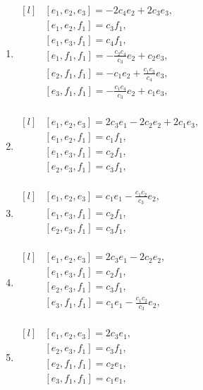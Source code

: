\begin{adjustwidth*}{-0.5cm}{0cm}
\begin{multicols*}{2}
\begin{enumerate}
    \item $\begin{matrix*}[l]
            & [e_1, e_2, e_3] =  - 2 c_{4} e_2 + 2 c_{3} e_3, \\
            & [e_1, e_2, f_1] = c_{3} f_1, \\
            & [e_1, e_3, f_1] = c_{4} f_1, \\
            & [e_1, f_1, f_1] =  - \frac{c_{2} c_{4}}{c_{3}} e_2 + c_{2} e_3, \\
            & [e_2, f_1, f_1] =  - c_{1} e_2 + \frac{c_{1} c_{3}}{c_{4}} e_3, \\
            & [e_3, f_1, f_1] =  - \frac{c_{1} c_{4}}{c_{3}} e_2 + c_{1} e_3, \\
        \end{matrix*}$

    \item $\begin{matrix*}[l]
            & [e_1, e_2, e_3] = 2 c_{3} e_1 - 2 c_{2} e_2 + 2 c_{1} e_3, \\
            & [e_1, e_2, f_1] = c_{1} f_1, \\
            & [e_1, e_3, f_1] = c_{2} f_1, \\
            & [e_2, e_3, f_1] = c_{3} f_1, \\
        \end{matrix*}$

    \item $\begin{matrix*}[l]
            & [e_1, e_2, e_3] = c_{1} e_1 - \frac{c_{1} c_{2}}{c_{3}} e_2 , \\
            & [e_1, e_3, f_1] = c_{2} f_1, \\
            & [e_2, e_3, f_1] = c_{3} f_1, \\
        \end{matrix*}$

    \item $\begin{matrix*}[l]
            & [e_1, e_2, e_3] = 2 c_{3} e_1 - 2 c_{2} e_2 , \\
            & [e_1, e_3, f_1] = c_{2} f_1, \\
            & [e_2, e_3, f_1] = c_{3} f_1, \\
            & [e_3, f_1, f_1] = c_{1} e_1 - \frac{c_{1} c_{2}}{c_{3}} e_2 , \\
        \end{matrix*}$

    \item $\begin{matrix*}[l]
            & [e_1, e_2, e_3] = 2 c_{3} e_1  , \\
            & [e_2, e_3, f_1] = c_{3} f_1, \\
            & [e_2, f_1, f_1] = c_{2} e_1  , \\
            & [e_3, f_1, f_1] = c_{1} e_1  , \\
        \end{matrix*}$


\end{enumerate}
\end{multicols*}
\end{adjustwidth*}
